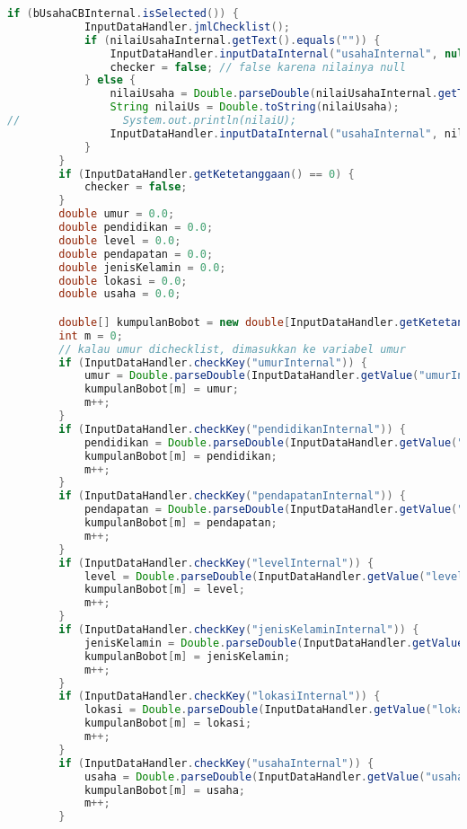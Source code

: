 \begin{lstlisting}[language=Java, caption=TampilanBobotKetetanggaan.java]
        if (bUsahaCBInternal.isSelected()) {
            InputDataHandler.jmlChecklist();
            if (nilaiUsahaInternal.getText().equals("")) {
                InputDataHandler.inputDataInternal("usahaInternal", null);
                checker = false; // false karena nilainya null
            } else {
                nilaiUsaha = Double.parseDouble(nilaiUsahaInternal.getText()) / 100.0;
                String nilaiUs = Double.toString(nilaiUsaha);
//                System.out.println(nilaiU);
                InputDataHandler.inputDataInternal("usahaInternal", nilaiUs);
            }
        }
        if (InputDataHandler.getKetetanggaan() == 0) {
            checker = false;
        }
        double umur = 0.0;
        double pendidikan = 0.0;
        double level = 0.0;
        double pendapatan = 0.0;
        double jenisKelamin = 0.0;
        double lokasi = 0.0;
        double usaha = 0.0;

        double[] kumpulanBobot = new double[InputDataHandler.getKetetanggaan()];
        int m = 0;
        // kalau umur dichecklist, dimasukkan ke variabel umur
        if (InputDataHandler.checkKey("umurInternal")) {
            umur = Double.parseDouble(InputDataHandler.getValue("umurInternal"));
            kumpulanBobot[m] = umur;
            m++;
        }
        if (InputDataHandler.checkKey("pendidikanInternal")) {
            pendidikan = Double.parseDouble(InputDataHandler.getValue("pendidikanInternal"));
            kumpulanBobot[m] = pendidikan;
            m++;
        }
        if (InputDataHandler.checkKey("pendapatanInternal")) {
            pendapatan = Double.parseDouble(InputDataHandler.getValue("pendapatanInternal"));
            kumpulanBobot[m] = pendapatan;
            m++;
        }
        if (InputDataHandler.checkKey("levelInternal")) {
            level = Double.parseDouble(InputDataHandler.getValue("levelInternal"));
            kumpulanBobot[m] = level;
            m++;
        }
        if (InputDataHandler.checkKey("jenisKelaminInternal")) {
            jenisKelamin = Double.parseDouble(InputDataHandler.getValue("jenisKelaminInternal"));
            kumpulanBobot[m] = jenisKelamin;
            m++;
        }
        if (InputDataHandler.checkKey("lokasiInternal")) {
            lokasi = Double.parseDouble(InputDataHandler.getValue("lokasiInternal"));
            kumpulanBobot[m] = lokasi;
            m++;
        }
        if (InputDataHandler.checkKey("usahaInternal")) {
            usaha = Double.parseDouble(InputDataHandler.getValue("usahaInternal"));
            kumpulanBobot[m] = usaha;
            m++;
        }
        

\end{lstlisting}
